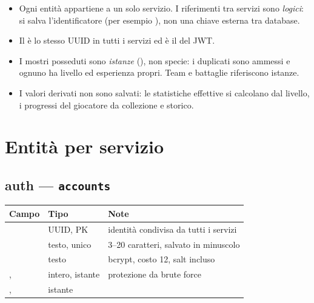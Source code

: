 \documentclass[11pt,a4paper]{report}
\begin{document}
\begin{itemize}
  \item Ogni entità appartiene a un solo servizio. I riferimenti tra servizi sono \emph{logici}: si salva l'identificatore (per esempio ), non una chiave esterna tra database.
  \item Il  è lo stesso UUID in tutti i servizi ed è il  del JWT.
  \item I mostri posseduti sono \emph{istanze} (), non specie: i duplicati sono ammessi e ognuno ha livello ed esperienza propri. Team e battaglie riferiscono istanze.
  \item I valori derivati non sono salvati: le statistiche effettive si calcolano dal livello, i progressi del giocatore da collezione e storico.
\end{itemize}

\section{Entità per servizio}

\subsection{auth --- \texttt{accounts}}
\begin{center}\small
\begin{tabularx}{\linewidth}{@{}P{3.4cm}P{2.6cm}L@{}}
\toprule
\textbf{Campo} & \textbf{Tipo} & \textbf{Note} \\
\midrule
{} & UUID, PK & identità condivisa da tutti i servizi \\
 & testo, unico & 3--20 caratteri, salvato in minuscolo \\
 & testo & bcrypt, costo 12, salt incluso \\
,  & intero, istante & protezione da brute force \\
,  & istante & \\
\bottomrule
\end{tabularx}
\end{center}

\end{document}
